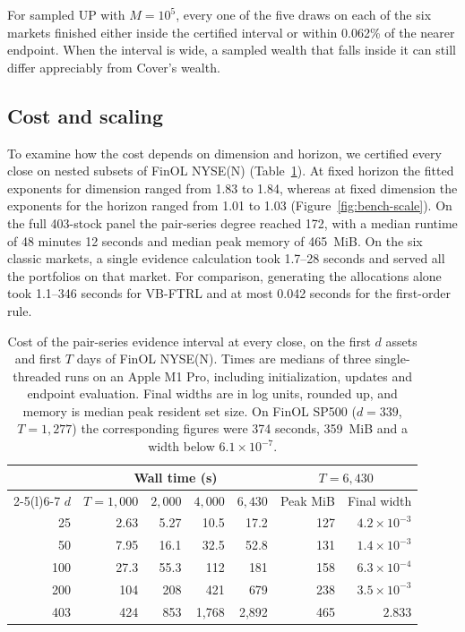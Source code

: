 \documentclass{article}
\numberwithin{equation}{section}
\theoremstyle{remark}
\begin{document}
For sampled UP with $M=10^5$, every one of the five draws on each of
the six markets finished either inside the certified interval or within
0.062\% of the nearer endpoint. When the interval is wide, a sampled
wealth that falls inside it can still differ appreciably from Cover's
wealth.

\subsection{Cost and scaling}\label{sec:cost}
To examine how the cost depends on dimension and horizon, we certified
every close on nested subsets of FinOL NYSE(N)
(Table~\ref{tab:bench-cost}). At fixed horizon the fitted exponents for
dimension ranged from 1.83 to 1.84, whereas at fixed dimension the
exponents for the horizon ranged from 1.01 to 1.03
(Figure~\ref{fig:bench-scale}). On the full 403-stock panel the
pair-series degree reached 172, with a median runtime of 48 minutes
12 seconds and median peak memory of 465~MiB. On the six classic
markets, a single evidence calculation took 1.7--28 seconds and served
all the portfolios on that market. For comparison, generating the
allocations alone took 1.1--346 seconds for VB-FTRL and at most
0.042 seconds for the first-order rule.

\begin{table}[tbp]
\centering
\caption{Cost of the pair-series evidence interval at every close, on the
first $d$ assets and first $T$ days of FinOL NYSE(N). Times are medians of
three single-threaded runs on an Apple M1 Pro, including initialization,
updates and endpoint evaluation. Final widths are in log units, rounded up,
and memory is median peak resident set size. On FinOL SP500 ($d=339$, $T=1{,}277$)
the corresponding figures were 374 seconds, 359~MiB and a width below
$6.1\times10^{-7}$.}
\label{tab:bench-cost}
\small
\begin{tabular}{@{}rrrrrrr@{}}
\toprule
 & \multicolumn{4}{c}{Wall time (s)} & \multicolumn{2}{c}{$T=6{,}430$}\\
\cmidrule(lr){2-5}\cmidrule(l){6-7}
$d$ & $T=1{,}000$ & $2{,}000$ & $4{,}000$ & $6{,}430$ & Peak MiB & Final width\\
\midrule
25 & 2.63 & 5.27 & 10.5 & 17.2 & 127 & $4.2\times10^{-3}$\\
50 & 7.95 & 16.1 & 32.5 & 52.8 & 131 & $1.4\times10^{-3}$\\
100 & 27.3 & 55.3 & 112 & 181 & 158 & $6.3\times10^{-4}$\\
200 & 104 & 208 & 421 & 679 & 238 & $3.5\times10^{-3}$\\
403 & 424 & 853 & 1,768 & 2,892 & 465 & $2.833$\\
\bottomrule
\end{tabular}
\end{table}
\end{document}
